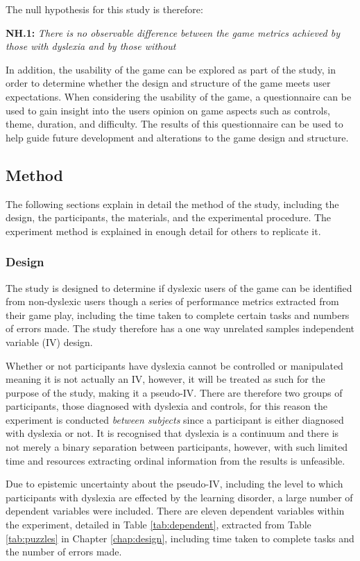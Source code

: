 \documentclass[journal]{IEEEtran}
\begin{document}
The null hypothesis for this study is therefore:
\begin{center}
\textbf{NH.1:} \textit{There is no observable difference between the game metrics achieved by those with dyslexia and by those without}
\end{center}

In addition, the usability of the game can be explored as part of the study, in order to determine whether the design and structure of the game meets user expectations. When considering the usability of the game, a questionnaire can be used to gain insight into the users opinion on game aspects such as controls, theme, duration, and difficulty. The results of this questionnaire can be used to help guide future development and alterations to the game design and structure.

\subsection{Method}
The following sections explain in detail the method of the study, including the design, the participants, the materials, and the experimental procedure. The experiment method is explained in enough detail for others to replicate it. 

\subsubsection{Design}
The study is designed to determine if dyslexic users of the game can be identified from non-dyslexic users though a series of performance metrics extracted from their game play, including the time taken to complete certain tasks and numbers of errors made. The study therefore has a one way unrelated samples independent variable (IV) design.

Whether or not participants have dyslexia cannot be controlled or manipulated meaning it is not actually an IV, however, it will be treated as such for the purpose of the study, making it a pseudo-IV. There are therefore two groups of participants, those diagnosed with dyslexia and controls, for this reason the experiment is conducted \emph{between subjects} since a participant is either diagnosed with dyslexia or not\cite{cairns2008}. It is recognised that dyslexia is a continuum and there is not merely a binary separation between participants,  however, with such limited time and resources extracting ordinal information from the results is unfeasible.

Due to epistemic uncertainty about the pseudo-IV, including the level to which participants with dyslexia are effected by the learning disorder, a large number of dependent variables were included. There are eleven dependent variables within the experiment, detailed in Table \ref{tab:dependent}, extracted from Table \ref{tab:puzzles} in Chapter \ref{chap:design}, including time taken to complete tasks and the number of errors made.
\end{document}
